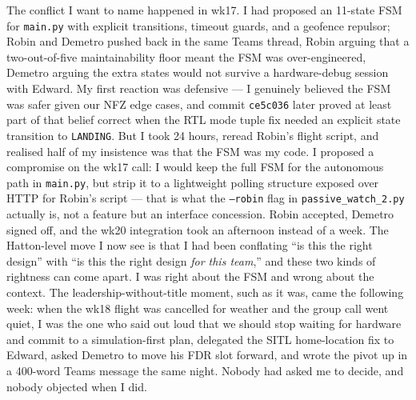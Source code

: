 The conflict I want to name happened in wk17. I had proposed an 11-state FSM for \texttt{main.py} with explicit transitions, timeout guards, and a geofence repulsor; Robin and Demetro pushed back in the same Teams thread, Robin arguing that a two-out-of-five maintainability floor meant the FSM was over-engineered, Demetro arguing the extra states would not survive a hardware-debug session with Edward. My first reaction was defensive --- I genuinely believed the FSM was safer given our NFZ edge cases, and commit \texttt{ce5c036} later proved at least part of that belief correct when the RTL mode tuple fix needed an explicit state transition to \texttt{LANDING}. But I took 24 hours, reread Robin's flight script, and realised half of my insistence was that the FSM was my code. I proposed a compromise on the wk17 call: I would keep the full FSM for the autonomous path in \texttt{main.py}, but strip it to a lightweight polling structure exposed over HTTP for Robin's script --- that is what the \texttt{--robin} flag in \texttt{passive\_watch\_2.py} actually is, not a feature but an interface concession. Robin accepted, Demetro signed off, and the wk20 integration took an afternoon instead of a week. The Hatton-level move I now see is that I had been conflating ``is this the right design'' with ``is this the right design \emph{for this team},'' and these two kinds of rightness can come apart. I was right about the FSM and wrong about the context. The leadership-without-title moment, such as it was, came the following week: when the wk18 flight was cancelled for weather and the group call went quiet, I was the one who said out loud that we should stop waiting for hardware and commit to a simulation-first plan, delegated the SITL home-location fix to Edward, asked Demetro to move his FDR slot forward, and wrote the pivot up in a 400-word Teams message the same night. Nobody had asked me to decide, and nobody objected when I did.

